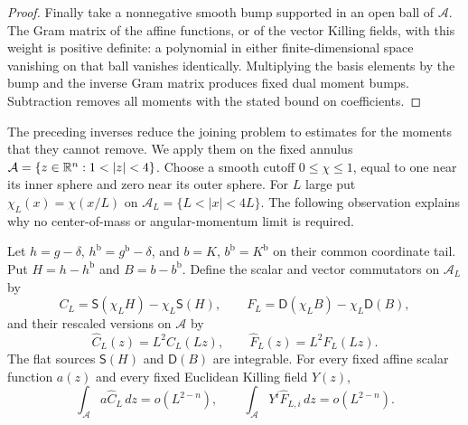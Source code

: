 \begin{proof}
Finally take a nonnegative smooth bump supported in an open ball
of $\mathcal A$.  The Gram matrix of the affine functions, or
of the vector Killing fields, with this weight is positive
definite: a polynomial in either finite-dimensional space
vanishing on that ball vanishes identically.  Multiplying the
basis elements by the bump and the inverse Gram matrix produces
fixed dual moment bumps.  Subtraction removes all moments with
the stated bound on coefficients.
\end{proof}

The preceding inverses reduce the joining problem to estimates for
the moments that they cannot remove. We apply them on the fixed annulus
$\mathcal A=\{z\in\R^n:1<|z|<4\}$. Choose a smooth cutoff
$0\le\chi\le1$, equal to one near its inner sphere and zero near
its outer sphere. For $L$ large put $\chi_L(x)=\chi(x/L)$ on
$\mathcal A_L=\{L<|x|<4L\}$. The following observation explains
why no center-of-mass or angular-momentum limit is required.

\begin{lemma}\label{lem:end:moments}
Let $h=g-\delta$, $h^{\mathrm b}=g^{\mathrm b}-\delta$, and
$b=K$, $b^{\mathrm b}=K^{\mathrm b}$ on their common coordinate
tail. Put $H=h-h^{\mathrm b}$ and $B=b-b^{\mathrm b}$. Define
the scalar and vector commutators on $\mathcal A_L$ by
\[
 C_L=\mathsf S(\chi_LH)-\chi_L\mathsf S(H),\qquad
 F_L=\mathsf D(\chi_LB)-\chi_L\mathsf D(B),
\]
and their rescaled versions on $\mathcal A$ by
\[
 \widehat C_L(z)=L^2C_L(Lz),\qquad
 \widehat F_L(z)=L^2F_L(Lz).
\]
The flat sources $\mathsf S(H)$ and $\mathsf D(B)$ are integrable.
For every fixed affine scalar function $a(z)$ and every fixed
Euclidean Killing field $Y(z)$,
\[
 \int_{\mathcal A}a\widehat C_L\,dz=o(L^{2-n}),\qquad
 \int_{\mathcal A}Y^i\widehat F_{L,i}\,dz=o(L^{2-n}).
\]
\end{lemma}

